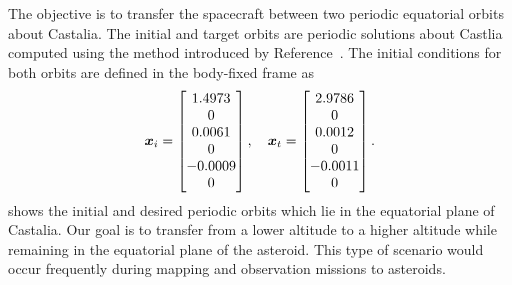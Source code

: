 \documentclass[]{aiaa-tc}%
\begin{document}
The objective is to transfer the spacecraft between two periodic equatorial orbits about Castalia.
The initial and target orbits are periodic solutions about Castlia computed using the method introduced by Reference~.
The initial conditions for both orbits are defined in the body-fixed frame as
\begin{align}\label{sec:initial_transfer}
    \bm{x}_i = 
    \begin{bmatrix}
        1.4973 \\ 0 \\ 0.0061 \\ 0\\ -0.0009 \\ 0
    \end{bmatrix} ,
    \quad
    \bm{x}_t =
    \begin{bmatrix}
        2.9786 \\ 0 \\ 0.0012 \\ 0\\ -0.0011 \\ 0
    \end{bmatrix} .
\end{align}
 shows the initial and desired periodic orbits which lie in the equatorial plane of Castalia.
Our goal is to transfer from a lower altitude to a higher altitude while remaining in the equatorial plane of the asteroid.
This type of scenario would occur frequently during mapping and observation missions to asteroids.
\end{document}

